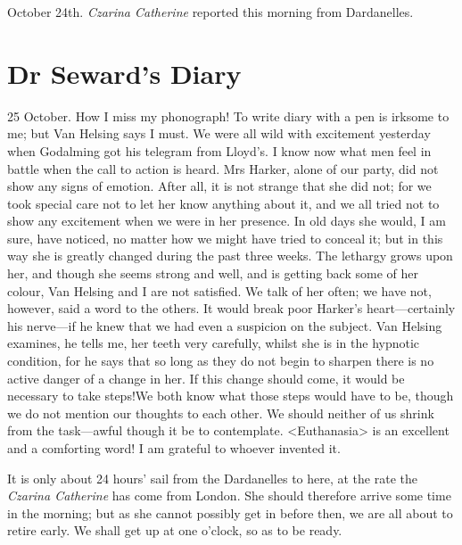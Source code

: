 \begin{telegram}{October 24th.}
\textit{Czarina Catherine} reported this morning from Dardanelles.
\end{telegram}

\section{Dr Seward's Diary}

\begin{diary}{25 October.}
How I miss my phonograph! To write diary with a pen is irksome to me; but Van Helsing says I must. We were all wild with excitement yesterday when Godalming got his telegram from Lloyd's. I know now what men feel in battle when the call to action is heard. Mrs Harker, alone of our party, did not show any signs of emotion. After all, it is not strange that she did not; for we took special care not to let her know anything about it, and we all tried not to show any excitement when we were in her presence. In old days she would, I am sure, have noticed, no matter how we might have tried to conceal it; but in this way she is greatly changed during the past three weeks. The lethargy grows upon her, and though she seems strong and well, and is getting back some of her colour, Van Helsing and I are not satisfied. We talk of her often; we have not, however, said a word to the others. It would break poor Harker's heart—certainly his nerve—if he knew that we had even a suspicion on the subject. Van Helsing examines, he tells me, her teeth very carefully, whilst she is in the hypnotic condition, for he says that so long as they do not begin to sharpen there is no active danger of a change in her. If this change should come, it would be necessary to take steps!\textellipsis We both know what those steps would have to be, though we do not mention our thoughts to each other. We should neither of us shrink from the task—awful though it be to contemplate. <Euthanasia> is an excellent and a comforting word! I am grateful to whoever invented it.

It is only about 24 hours' sail from the Dardanelles to here, at the rate the \textit{Czarina Catherine} has come from London. She should therefore arrive some time in the morning; but as she cannot possibly get in before then, we are all about to retire early. We shall get up at one o'clock, so as to be ready.
\end{diary}
 

